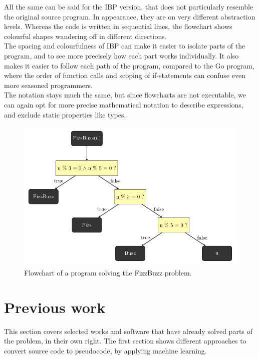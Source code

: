 All the same can be said for the IBP version, that does not particularly resemble the original source program. In appearance, they are on very different abstraction levels. Whereas the code is written in sequential lines, the flowchart shows colourful shapes wandering off in different directions. \\

The spacing and colourfulness of IBP can make it easier to isolate parts of the program, and to see more precisely how each part works individually. It also makes it easier to follow each path of the program, compared to the Go program, where the order of function calls and scoping of if-statements can confuse even more seasoned programmers. \\

The notation stays much the same, but since flowcharts are not executable, we can again opt for more precise mathematical notation to describe expressions, and exclude static properties like types.

\begin{figure}[ht]
    \centering
    \includegraphics[scale=.75]{assets/chapter3/FizzBuzzTikZ.pdf}
    \caption{Flowchart of a program solving the FizzBuzz problem.}
    \label{FizzBuzzTikZ.}
\end{figure}

\section{Previous work}

This section covers selected works and software that have already solved parts of the problem, in their own right. The first section shows different approaches to convert source code to pseudocode, by applying machine learning. \\

